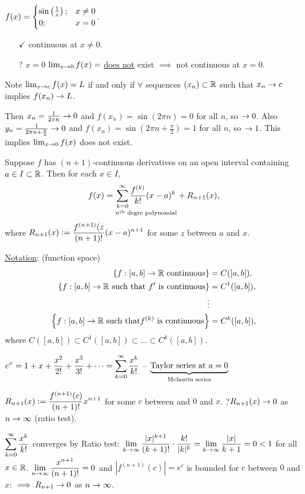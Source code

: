 \documentclass[]{article}
\begin{document}
\begin{example}
	$f(x) = \begin{cases} \sin\plr{\frac1x}; & x\neq 0 \\ 0; & x=0 \end{cases}$.
	\begin{itemize}
		\item[$\checkmark$] continuous at $x\neq 0$. 
		\item[?] $x=0$ $\lim_{x\ra0} f(x) = $ \ul{does not} exist $\implies$ not continuous at $x=0$.
	\end{itemize}
	Note $\lim_{x\ra c}f(x) = L$ if and only if $\forall$ sequences $(x_n)\subset\mb R$ such that $x_n\ra c$ implies $f(x_n)\ra L$.

	Then $x_n = \frac1{2\pi n}\ra 0$ and $f(x_n) =\sin(2\pi n) = 0$ for all $n$, so $\ra0$.
	Also $y_n = \frac1{2\pi n+\frac\pi2} \ra 0$ and $f(x_n) = \sin(2\pi n+\frac\pi2)=1$ for all $n$, so $\ra1$.
	This implies $\lim_{x\ra 0}f(x)$ does not exist.
\end{example}

\newpage

\begin{theorem}
	Suppose $f$ has $(n+1)$-continuous derivatives on an open interval containing $a\in I\subset\mb R$.
	Then for each $x\in I$,
	$$f(x) = \us{n^\text{th}\text{ degre polynomial}}{\sum_{k=0}^\infty \frac{f^{(k)}}{k!}(x-a)^k} + R_{n+1}(x),$$
	where $\ds R_{n+1}(x) := \frac{f^{(n+1)}(z}{(n+1)!}(x-a)^{n+1}$ for some $z$ between $a$ and $x$.
\end{theorem}
\ul{Notation}: (function space) 
\begin{align*} 
	\set{f:[a,b]\ra\mb R\text{ continuous}} &= C([a,b]), \\
	\set{f:[a,b]\ra\mb R\text{ such that }f'\text{ is continuous}} &= C^1([a,b]), \\
	\vdots \\
	\set{f:[a,b]\ra\mb R\text{ such that}f^{(k)}\text{ is continuous}} &= C^k([a,b]),
\end{align*}
where $C([a,b]) \subset C^1([a,b]) \subset \dots \subset C^k([a,b])$.

\begin{example}
	$\ds e^x = 1+x+\frac{x^2}{2!} + \frac{x^3}{3!} + \dots = \sum_{k=0}^\infty \frac{x^k}{k!}$ -- $\ub{\text{Mclaurin series}}{\text{Taylor series at }a=0}$

	$\ds R_{n+1}(x) := \frac{f^{(n+1)}(c)}{(n+1)!} x^{n+1}$ for some $c$ between and $0$ and $x$.
	?$R_{n+1}(x) \ra 0$ as $n\ra\infty$ (ratio test).

	$\ds\sum_{k=0}^\infty \frac{x^k}{k!}$ converges by Ratio test: $\ds\lim_{k\ra\infty} \frac{|x|^{k+1}}{(k+1)!} \cdot \frac{k!}{|k|^k} = \lim_{k\ra\infty} \frac{|x|}{k+1} = 0 < 1$ for all $x\in\mb R$.
	$\ds\lim_{n\ra\infty} \frac{x^{n+1}}{(n+1)!}=0$ and $|f^{(n+1)}(c)| = e^c$ is bounded for $c$ between $0$ and $x$: $\implies R_{n+1} \ra 0$ as $n\ra\infty$.
\end{example}
\end{document}
